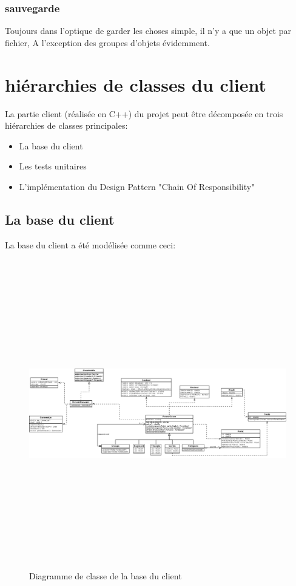 \documentclass[10pt,a4paper]{report}
\begin{document}
\begin{spacing}{0.8}
\section{sauvegarde}
Toujours dans l'optique de garder les choses simple, il n'y a que un objet par fichier, A l'exception des groupes d'objets évidemment.


\part{hiérarchies de classes du client}
La partie client (réalisée en C++) du projet peut être décomposée en trois hiérarchies de classes principales:
\begin{itemize}
\item La base du client
\item Les tests unitaires
\item L'implémentation du Design Pattern "Chain Of Responsibility"
\end{itemize}

\chapter{La base du client}
La base du client a été modélisée comme ceci:
\begin{figure}[H]
\includegraphics[height=380pt, width=450pt]{DiagrammeDeClasses.png}
\caption{Diagramme de classe de la base du client}
\end{figure}


\end{spacing}
\end{document}
